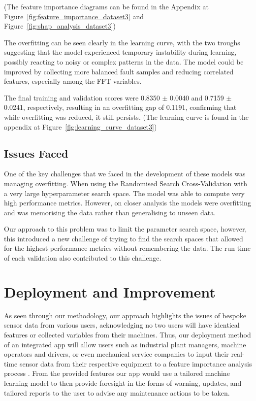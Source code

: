 \documentclass[11pt]{article}
\begin{document}
(The feature importance diagrams can be found in the Appendix at Figure~\ref{fig:feature_importance_dataset3} and Figure~\ref{fig:shap_analysis_dataset3})

The overfitting can be seen clearly in the learning curve, with the two troughs suggesting that the model experienced temporary instability during learning, possibly reacting to noisy or complex patterns in the data. The model could be improved by collecting more balanced fault samples and reducing correlated features, especially among the FFT variables.

The final training and validation scores were 0.8350 $\pm$ 0.0040 and 0.7159 $\pm$ 0.0241, respectively, resulting in an overfitting gap of 0.1191, confirming that while overfitting was reduced, it still persists. (The learning curve is found in the appendix at Figure~\ref{fig:learning_curve_dataset3})



\subsection{Issues Faced}
One of the key challenges that we faced in the development of these models was managing overfitting. When using the Randomised Search Cross-Validation with a very large hyperparameter search space. The model was able to compute very high performance metrics. However, on closer analysis the models were overfitting and was memorising the data rather than generalising to unseen data.

Our approach to this problem was to limit the parameter search space, however, this introduced a new challenge of trying to find the search spaces that allowed for the highest performance metrics without remembering the data. The run time of each validation also contributed to this challenge.


\section{Deployment and Improvement}

As seen through our methodology, our approach highlights the issues of bespoke sensor data from various users, acknowledging no two users will have identical features or collected variables from their machines. Thus, our deployment method of an integrated app will allow users such as industrial plant managers, machine operators and drivers, or even mechanical service companies to input their real-time sensor data from their respective equipment to a feature importance analysis process \cite{rakholia2025}. From the provided features our app would use a tailored machine learning model to then provide foresight in the forms of warning, updates, and tailored reports to the user to advise any maintenance actions to be taken. 
\end{document}
